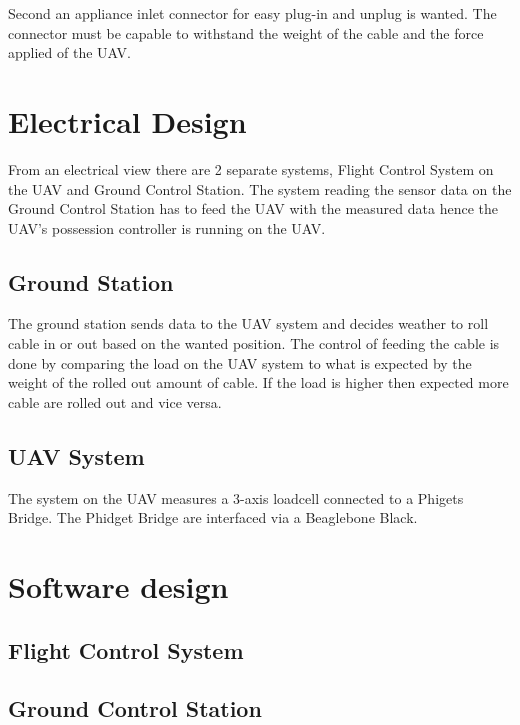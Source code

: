 
Second an appliance inlet connector for easy plug-in and unplug is wanted. The connector must be capable to withstand the weight of the cable and the force applied of the UAV. 




\section{Electrical Design}
From an electrical view there are 2 separate systems, Flight Control System on the UAV and Ground Control Station. The system reading the sensor data on the Ground Control Station has to feed the UAV with the measured data hence the UAV's possession controller is running on the UAV. 


\subsection{Ground Station}
The ground station sends data to the UAV system and decides weather to roll cable in or out based on the wanted position. The control of feeding the cable is done by comparing the load on the UAV system to what is expected by the weight of the rolled out amount of cable. If the load is higher then expected more cable are rolled out and vice versa.  


\subsection{UAV System}
The system on the UAV measures a 3-axis loadcell connected to a Phigets Bridge. The Phidget Bridge are interfaced via a Beaglebone Black.  




\section{Software design}


\subsection{Flight Control System}


\subsection{Ground Control Station}
